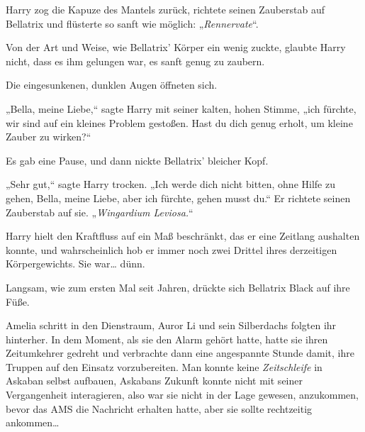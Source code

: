 Harry zog die Kapuze des Mantels zurück, richtete seinen Zauberstab auf Bellatrix und flüsterte so sanft wie möglich: „\emph{Rennervate}“.

Von der Art und Weise, wie Bellatrix' Körper ein wenig zuckte, glaubte Harry nicht, dass es ihm gelungen war, es sanft genug zu zaubern.

Die eingesunkenen, dunklen Augen öffneten sich.

„Bella, meine Liebe,“ sagte Harry mit seiner kalten, hohen Stimme, „ich fürchte, wir sind auf ein kleines Problem gestoßen. Hast du dich genug erholt, um kleine Zauber zu wirken?“

Es gab eine Pause, und dann nickte Bellatrix' bleicher Kopf.

„Sehr gut,“ sagte Harry trocken. „Ich werde dich nicht bitten, ohne Hilfe zu gehen, Bella, meine Liebe, aber ich fürchte, gehen musst du.“ Er richtete seinen Zauberstab auf sie. „\emph{Wingardium Leviosa.}“

Harry hielt den Kraftfluss auf ein Maß beschränkt, das er eine Zeitlang aushalten konnte, und wahrscheinlich hob er immer noch zwei Drittel ihres derzeitigen Körpergewichts. Sie war… dünn.

Langsam, wie zum ersten Mal seit Jahren, drückte sich Bellatrix Black auf ihre Füße.

\later

Amelia schritt in den Dienstraum, Auror Li und sein Silberdachs folgten ihr hinterher. In dem Moment, als sie den Alarm gehört hatte, hatte sie ihren Zeitumkehrer gedreht und verbrachte dann eine angespannte Stunde damit, ihre Truppen auf den Einsatz vorzubereiten. Man konnte keine \emph{Zeitschleife} in Askaban selbst aufbauen, Askabans Zukunft konnte nicht mit seiner Vergangenheit interagieren, also war sie nicht in der Lage gewesen, anzukommen, bevor das AMS die Nachricht erhalten hatte, aber sie sollte rechtzeitig ankommen…

